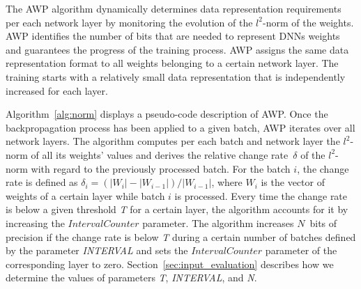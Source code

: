 The AWP algorithm dynamically  
determines data representation requirements per each network layer by monitoring the 
evolution of the $l^2$-norm of the weights.
AWP identifies the number of bits that are needed to represent 
DNNs weights and guarantees the progress of the training process.
AWP assigns the same data representation format to all weights 
belonging to a certain network layer.
The training starts with a relatively small data representation that is independently 
increased for each layer. 
%

Algorithm~\ref{alg:norm} displays a pseudo-code description of AWP.
Once the backpropagation process has been applied to a given batch, AWP iterates over all network layers.
The algorithm computes per each batch and network layer the $l^2$-norm of all its weights' values 
and derives the relative change rate~$\delta$ of the $l^2$-norm 
with regard to the previously processed batch. 
For the batch $i$, the change rate is defined as  
$\delta_i=(|W_i| - |W_{i-1}|)/|W_{i-1}|$, where $W_i$ is the vector of weights 
of a certain layer while batch $i$ is processed. 
Every time the change rate is below a given threshold \textit{T} for a certain 
layer, the algorithm accounts for it by increasing the $IntervalCounter$ parameter.
The algorithm increases $N$~bits of precision if the change 
rate is below \textit{T} during a certain number of batches defined by the parameter
\textit{INTERVAL} 
and sets the $IntervalCounter$ parameter of the corresponding layer to zero.
Section~\ref{sec:input_evaluation} describes how we determine the values of parameters \textit{T}, \textit{INTERVAL}, and \textit{N}.

